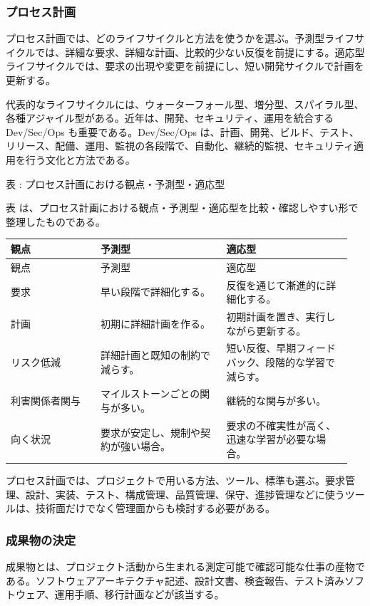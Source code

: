 \subsubsection{プロセス計画}
プロセス計画では、どのライフサイクルと方法を使うかを選ぶ。予測型ライフサイクルでは、詳細な要求、詳細な計画、比較的少ない反復を前提にする。適応型ライフサイクルでは、要求の出現や変更を前提にし、短い開発サイクルで計画を更新する。

代表的なライフサイクルには、ウォーターフォール型、増分型、スパイラル型、各種アジャイル型がある。近年は、開発、セキュリティ、運用を統合する Dev/Sec/Ops も重要である。Dev/Sec/Ops は、計画、開発、ビルド、テスト、リリース、配備、運用、監視の各段階で、自動化、継続的監視、セキュリティ適用を行う文化と方法である。

\par\smallskip\noindent{}\label{tab:ch09-03}表 \thetable: プロセス計画における観点・予測型・適応型\par\smallskip
表 \thetable は、プロセス計画における観点・予測型・適応型を比較・確認しやすい形で整理したものである。\par\smallskip
\begin{longtable}{>{\raggedright\arraybackslash}p{0.25\linewidth}>{\raggedright\arraybackslash}p{0.35\linewidth}>{\raggedright\arraybackslash}p{0.35\linewidth}}
\toprule
観点 & 予測型 & 適応型 \\
\midrule
\endfirsthead
\toprule
観点 & 予測型 & 適応型 \\
\midrule
\endhead
要求 & 早い段階で詳細化する。 & 反復を通じて漸進的に詳細化する。 \\
計画 & 初期に詳細計画を作る。 & 初期計画を置き、実行しながら更新する。 \\
リスク低減 & 詳細計画と既知の制約で減らす。 & 短い反復、早期フィードバック、段階的な学習で減らす。 \\
利害関係者関与 & マイルストーンごとの関与が多い。 & 継続的な関与が多い。 \\
向く状況 & 要求が安定し、規制や契約が強い場合。 & 要求の不確実性が高く、迅速な学習が必要な場合。 \\
\bottomrule
\end{longtable}

プロセス計画では、プロジェクトで用いる方法、ツール、標準も選ぶ。要求管理、設計、実装、テスト、構成管理、品質管理、保守、進捗管理などに使うツールは、技術面だけでなく管理面からも検討する必要がある。

\subsubsection{成果物の決定}
成果物とは、プロジェクト活動から生まれる測定可能で確認可能な仕事の産物である。ソフトウェアアーキテクチャ記述、設計文書、検査報告、テスト済みソフトウェア、運用手順、移行計画などが該当する。

